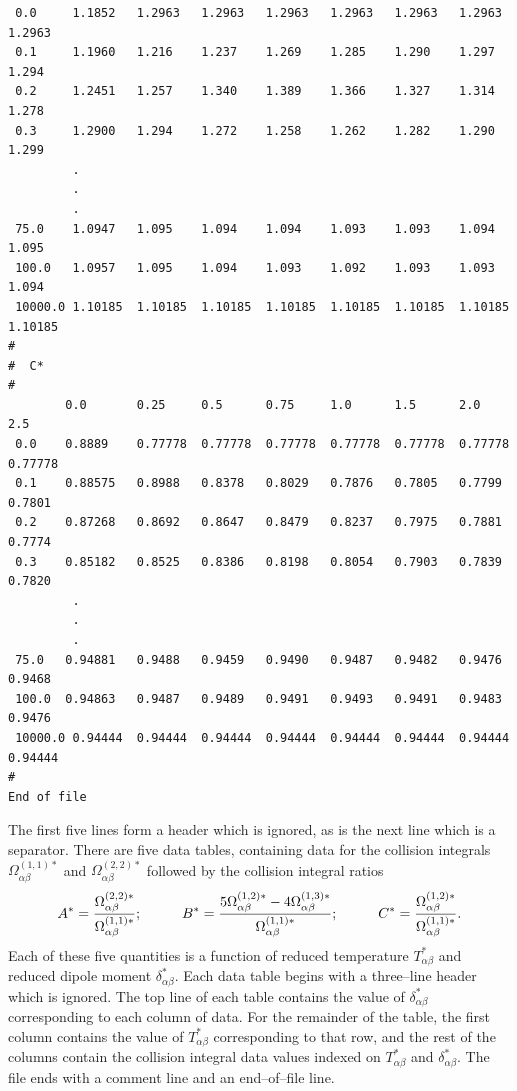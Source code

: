 \documentclass[dvips]{article}
\begin{document}
\begin{verbatim}
 0.0     1.1852   1.2963   1.2963   1.2963   1.2963   1.2963   1.2963   1.2963
 0.1     1.1960   1.216    1.237    1.269    1.285    1.290    1.297    1.294
 0.2     1.2451   1.257    1.340    1.389    1.366    1.327    1.314    1.278
 0.3     1.2900   1.294    1.272    1.258    1.262    1.282    1.290    1.299
         .
         .
         .
 75.0    1.0947   1.095    1.094    1.094    1.093    1.093    1.094    1.095
 100.0   1.0957   1.095    1.094    1.093    1.092    1.093    1.093    1.094
 10000.0 1.10185  1.10185  1.10185  1.10185  1.10185  1.10185  1.10185  1.10185
#
#  C*
#
        0.0       0.25     0.5      0.75     1.0      1.5      2.0      2.5
 0.0    0.8889    0.77778  0.77778  0.77778  0.77778  0.77778  0.77778  0.77778
 0.1    0.88575   0.8988   0.8378   0.8029   0.7876   0.7805   0.7799   0.7801
 0.2    0.87268   0.8692   0.8647   0.8479   0.8237   0.7975   0.7881   0.7774
 0.3    0.85182   0.8525   0.8386   0.8198   0.8054   0.7903   0.7839   0.7820
         .
         .
         .
 75.0   0.94881   0.9488   0.9459   0.9490   0.9487   0.9482   0.9476   0.9468
 100.0  0.94863   0.9487   0.9489   0.9491   0.9493   0.9491   0.9483   0.9476
 10000.0 0.94444  0.94444  0.94444  0.94444  0.94444  0.94444  0.94444  0.94444
#
End of file
\end{verbatim}
The first five lines form a header which is ignored, as is the next
line which is a separator.  There are five data tables, containing
data for the collision integrals
$\Omega_{\alpha\beta}^{(1,1)*}$ and $\Omega_{\alpha\beta}^{(2,2)*}$ followed
by the collision integral ratios
\begin{equation}
A^{*} = \frac{\Omega_{\alpha\beta}^{(2,2)*}}{\Omega_{\alpha\beta}^{(1,1)*}}
;\hspace{10mm}
B^{*} =
\frac{5\Omega_{\alpha\beta}^{(1,2)*}-4\Omega_{\alpha\beta}^{(1,3)*}}
{\Omega_{\alpha\beta}^{(1,1)*}}
;\hspace{10mm}
C^{*} = \frac{\Omega_{\alpha\beta}^{(1,2)*}}{\Omega_{\alpha\beta}^{(1,1)*}}.
\label{COLRATS}
\end{equation}
Each of these five quantities is a function of reduced temperature
$T_{\alpha\beta}^{*}$ and reduced dipole moment $\delta_{\alpha\beta}^{*}$.
Each data table begins with a three--line header which is ignored.  The
top line of each table contains the value of $\delta_{\alpha\beta}^{*}$
corresponding to each column of data.  For the remainder of the table,
the first column contains the value of $T_{\alpha\beta}^{*}$ corresponding to
that row, and the rest of the columns contain the collision integral data
values indexed on $T_{\alpha\beta}^{*}$ and $\delta_{\alpha\beta}^{*}$.
The file ends with a comment line and an end--of--file line.
\end{document}
